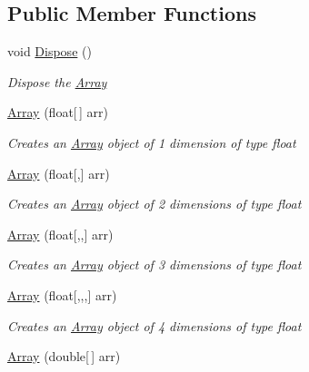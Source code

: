 \subsection*{Public Member Functions}
\begin{DoxyCompactItemize}
\item 
void \mbox{\hyperlink{classkhiva_1_1array_1_1_array_a28ae91149f1cfb1974b3ebb91f013421}{Dispose}} ()
\begin{DoxyCompactList}\small\item\em Dispose the \mbox{\hyperlink{classkhiva_1_1array_1_1_array}{Array}} \end{DoxyCompactList}\item 
\mbox{\hyperlink{classkhiva_1_1array_1_1_array_acf6eb7cec3d471df6180ac78fd5f46eb}{Array}} (float\mbox{[}$\,$\mbox{]} arr)
\begin{DoxyCompactList}\small\item\em Creates an \mbox{\hyperlink{classkhiva_1_1array_1_1_array}{Array}} object of 1 dimension of type float \end{DoxyCompactList}\item 
\mbox{\hyperlink{classkhiva_1_1array_1_1_array_aad963c08b59b6dc77a59f8b8c14d9a05}{Array}} (float\mbox{[},\mbox{]} arr)
\begin{DoxyCompactList}\small\item\em Creates an \mbox{\hyperlink{classkhiva_1_1array_1_1_array}{Array}} object of 2 dimensions of type float \end{DoxyCompactList}\item 
\mbox{\hyperlink{classkhiva_1_1array_1_1_array_a1dedcbb4b8d015d0f18ec811d034a092}{Array}} (float\mbox{[},,\mbox{]} arr)
\begin{DoxyCompactList}\small\item\em Creates an \mbox{\hyperlink{classkhiva_1_1array_1_1_array}{Array}} object of 3 dimensions of type float \end{DoxyCompactList}\item 
\mbox{\hyperlink{classkhiva_1_1array_1_1_array_ac66e1423286505b97c30ff89bb9d52b6}{Array}} (float\mbox{[},,,\mbox{]} arr)
\begin{DoxyCompactList}\small\item\em Creates an \mbox{\hyperlink{classkhiva_1_1array_1_1_array}{Array}} object of 4 dimensions of type float \end{DoxyCompactList}\item 
\mbox{\hyperlink{classkhiva_1_1array_1_1_array_a8f470923dc4890df05558aac21f1a49c}{Array}} (double\mbox{[}$\,$\mbox{]} arr)

\end{DoxyCompactItemize}
